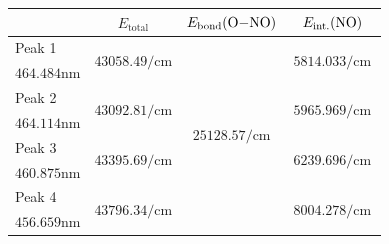 \documentclass[aspectratio=1610,scheme=plain]{ctexbeamer}
\begin{document}
	\begin{frame}{\insertsubsection}{\insertsubsubsection}
		\begin{table}[htbp]
			\centering
			\tiny
			\begin{tabularx}{0.73\textwidth}{lccc}		
				\toprule		
				& $E_\text{total}$ & $E_\text{bond}(\ce{O-NO})$ \footfullcite{ono}& $E_\text{int.}(\ce{NO})$ \\
				\midrule
				Peak 1 & \multirow{2}[2]{*}{$\num{43058.49}\unit{\per \centi \meter}$} & \multirow{8}[8]{*}{$\num{25128.57}\unit{\per \centi \meter}$} & \multirow{2}[2]{*}{\,\;\;$\num{5814.033}\unit{\per \centi \meter}$\,\;\;} \\
				$\num{464.484}\unit{\nano\meter}$ & & & \\
				\cmidrule{1-2}\cmidrule{4-4}
				Peak 2 & \multirow{2}[2]{*}{$\num{43092.81}\unit{\per \centi \meter}$} & & \multirow{2}[2]{*}{$\num{5965.969}\unit{\per \centi \meter}$} \\
				$\num{464.114}\unit{\nano\meter}$ & & & \\
				\cmidrule{1-2}\cmidrule{4-4}
				Peak 3 & \multirow{2}[2]{*}{$\num{43395.69}\unit{\per \centi \meter}$} & & \multirow{2}[2]{*}{$\num{6239.696}\unit{\per \centi \meter}$} \\
				$\num{460.875}\unit{\nano\meter}$ & & & \\
				\cmidrule{1-2}\cmidrule{4-4}
				Peak 4 & \multirow{2}[2]{*}{$\num{43796.34}\unit{\per \centi \meter}$} & & \multirow{2}[2]{*}{$\num{8004.278}\unit{\per \centi \meter}$} \\
				$\num{456.659}\unit{\nano\meter}$ & & & \\
				\bottomrule
			\end{tabularx}
		\end{table}
	\end{frame}
\end{document}

